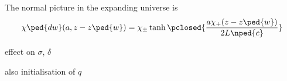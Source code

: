 



\newcommand{\brchi}{\breve{\chi}}
\newcommand{\eqregimenum}[1]{{\footnotesize{\textsf{\textbf{({#1})}}}}}










The normal picture in the expanding universe is
\begin{equation}
    \chi\ped{dw}(a, z-z\ped{w}) = \chi_\pm \tanh{ \pclosed{\frac{a\chi_+(z-z\ped{w})}{2L\nped{c}} }}
\end{equation}




\begin{bullets}
    \item effect on $\sigma$, $\delta$
    \item also initialisation of $q$
\end{bullets}



